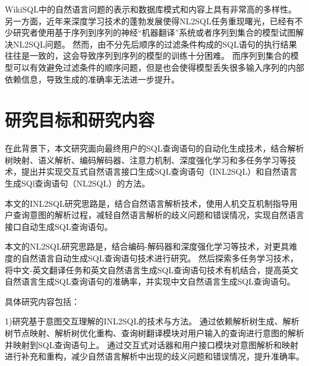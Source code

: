 WikiSQL中的自然语言问题的表示和数据库模式和内容上具有非常高的多样性。
另一方面，近年来深度学习技术的蓬勃发展使得NL2SQL任务重现曙光，已经有不少研究者使用基于序列到序列的神经“机器翻译”系统\cite{zhong2017seq2sql,dong2016language}或者序列到集合的模型\cite{xu2017sqlnet,yu2018typesql}试图解决NL2SQL问题。
然而，由不分先后顺序的过滤条件构成的SQL语句的执行结果往往是一致的，这会导致序列到序列的模型的训练十分困难。
而序列到集合的模型可以有效避免过滤条件的顺序问题，但是也会使得模型丢失很多输入序列的内部依赖信息，导致生成的准确率无法进一步提升。


\section{研究目标和研究内容}
\label{intro:targetandcontent}
在此背景下，本文研究面向最终用户的SQL查询语句的自动化生成技术，结合解析树映射、语义解析、编码解码器、注意力机制、深度强化学习和多任务学习等技术，提出并实现交互式自然语言接口生成SQL查询语句（INL2SQL）和自然语言生成SQl查询语句（NL2SQL）的方法。

本文的INL2SQL研究思路是，结合自然语言解析技术，使用人机交互机制指导用户查询意图的解析过程，减轻自然语言解析的歧义问题和错误情况，实现自然语言接口自动生成SQL查询语句。

本文的NL2SQL研究思路是，结合编码-解码器和深度强化学习等技术，对更具难度的自然语言自动生成SQL查询语句技术进行研究。
然后探索多任务学习技术，将中文-英文翻译任务和英文自然语言生成SQL查询语句技术有机结合，提高英文自然语言生成SQL查询语句的准确率，并实现中文自然语言生成SQL查询语句。

具体研究内容包括：

1)研究基于意图交互理解的INL2SQL的技术与方法。
通过依赖解析树生成、解析树节点映射、解析树优化重构、查询树翻译模块对用户输入的查询进行意图的解析并映射到SQL查询语句上。
通过交互式对话器和用户接口模块对意图解析和映射进行补充和重构，减少自然语言解析中出现的歧义问题和错误情况，提升准确率。


